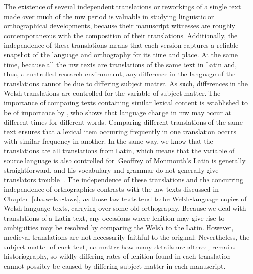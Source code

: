 The existence of several independent translations or reworkings of a single text made over much of the \gls{mw} period is valuable in studying linguistic or orthographical developments, because their manuscript witnesses are roughly contemporaneous with the composition of their translations.
Additionally, the independence of these translations means that each version captures a reliable snapshot of the language and orthography for its time and place.
At the same time, because all the \gls{mw} texts are translations of the same text in Latin and, thus, a controlled research environment,  any difference in the language of the translations cannot be due to differing subject matter.
As such, differences in the Welsh translations are controlled for the variable of subject matter.
The importance of comparing texts containing similar lexical content is established to be of importance by \textcite{Wil_Lexical05}, who shows that language change in \gls{mw} may occur at different times for different words.
Comparing different translations of the same text ensures that a lexical item occurring frequently in one translation  occurs with similar frequency in another.
In the same way, we know that the translations  are all translations from Latin, which means that the variable of source language is also controlled for.
Geoffrey of Monmouth's Latin is generally straightforward, and his vocabulary and grammar do not generally give translators trouble~\autocite[lxxvi]{Geo_History09}.
The independence of these translations and the concurring independence of orthographies contrasts with the law texts discussed in Chapter~\ref{cha:welsh-laws}, as those law texts tend to be Welsh-language copies of Welsh-language texts, carrying over some old orthography.
Because we deal with translations of a Latin text, any occasions where lenition may give rise to ambiguities may be resolved by comparing the Welsh to the Latin.
However, medieval translations are not necessarily faithful to the original:
Nevertheless, the subject matter of each text, no matter how many details are altered, remains historiography, so wildly differing rates of lenition found in each translation cannot possibly be caused by differing subject matter  in each manuscript.

